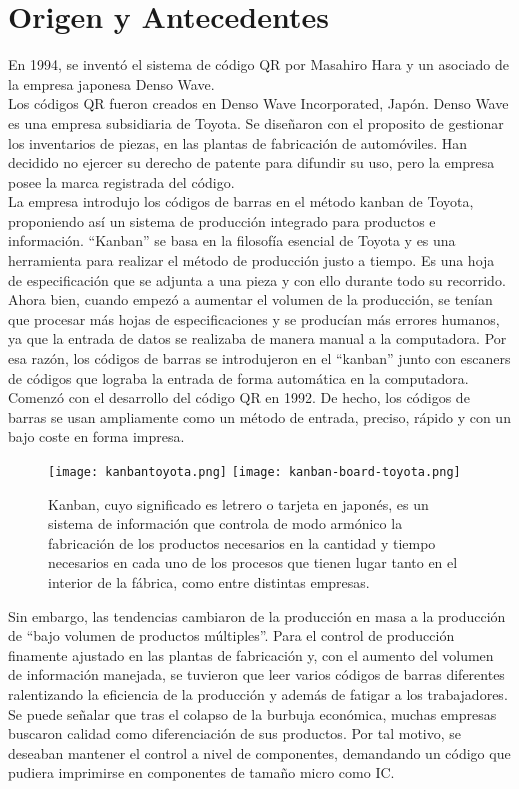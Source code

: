 \section{Origen y Antecedentes}

En 1994, se inventó el sistema de código QR por Masahiro Hara y un asociado de la empresa japonesa Denso Wave.\cite{2019_Hara}
\\
Los códigos QR fueron creados en Denso Wave Incorporated, Japón. Denso Wave es una empresa subsidiaria de Toyota. Se diseñaron con el proposito de gestionar los inventarios de piezas, en las plantas de fabricación de automóviles.  Han decidido no ejercer su derecho de patente para difundir su uso, pero la empresa posee la marca registrada del código.\cite{2014_Chang,2015_Emran_BOOK} 
\\
La empresa introdujo los códigos de barras en el método kanban de Toyota, proponiendo así un sistema de producción integrado para productos e información. ``Kanban'' se basa en la filosofía esencial de Toyota y es una herramienta para realizar el método de producción justo a tiempo. Es una hoja de especificación que se adjunta a una pieza y con ello durante todo su recorrido. Ahora bien, cuando empezó a aumentar el volumen de la producción, se tenían que procesar más hojas de especificaciones y se producían más errores humanos, ya que la entrada de datos se realizaba de manera manual a la computadora. Por esa razón, los códigos de barras se introdujeron en el ``kanban'' junto con escaners de códigos que lograba la entrada de forma automática en la computadora. Comenzó con el desarrollo del código QR en 1992. De hecho, los códigos de barras se usan ampliamente como un método de entrada, preciso, rápido y con un bajo coste en forma impresa.\cite{1998_Institute_Kore}

\begin{figure} 
\texttt{[image: kanbantoyota.png]}
\texttt{[image: kanban-board-toyota.png]}
\caption{Kanban, cuyo significado es letrero o tarjeta en japonés, es un sistema de información que controla de modo armónico la fabricación de los productos necesarios en la cantidad y tiempo necesarios en cada uno de los procesos que tienen lugar tanto en el interior de la fábrica, como entre distintas empresas.}
\label{fig:kanban1}
\end{figure}

Sin embargo, las tendencias cambiaron de la producción en masa a la producción de ``bajo volumen de productos múltiples''. Para el control de producción finamente ajustado en las plantas de fabricación y, con el aumento del volumen de información manejada, se tuvieron que leer varios códigos de barras diferentes ralentizando la eficiencia de la producción y además de fatigar a los trabajadores. Se puede señalar que tras el colapso de la burbuja económica, muchas empresas buscaron calidad como diferenciación de sus productos. Por tal motivo, se deseaban mantener el control a nivel de componentes, demandando un código que pudiera imprimirse en componentes de tamaño micro como IC.\cite{2002_Hoshino}

